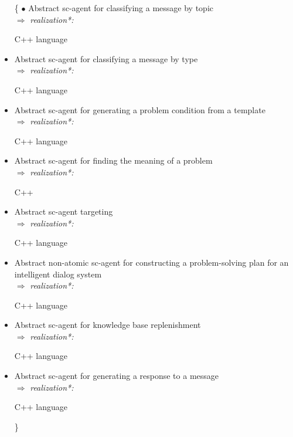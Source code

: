 \documentclass[a4paper, 10pt,]{article}
\begin{document}
\begin{itemize}
\item [\{ $\bullet$] Abstract sc-agent for classifying a message by topic
\\${\Rightarrow}$ 
\textit{realization*:}

\hspace{0.5cm}C++ language 

\item Abstract sc-agent for classifying a message by type
\\${\Rightarrow}$ 
\textit{realization*:}

\hspace{0.5cm}C++ language 
\item Abstract sc-agent for generating a problem condition from a template
\\${\Rightarrow}$ 
\textit{realization*:}

\hspace{0.5cm}C++ language 
\item Abstract sc-agent for finding the meaning of a problem
\\${\Rightarrow}$
\textit{realization*:}

\hspace{0.5cm}C++ 
\item Abstract sc-agent targeting
\\${\Rightarrow}$
\textit{realization*:}

\hspace{0.5cm}C++ language 
\item Abstract non-atomic sc-agent for constructing a problem-solving plan for an intelligent dialog system
\\${\Rightarrow}$
\textit{realization*:}

\hspace{0.5cm}C++ language 
\item Abstract sc-agent for knowledge base replenishment
\\${\Rightarrow}$
\textit{realization*:}

\hspace{0.5cm}C++ language 
\item Abstract sc-agent for generating a response to a message 
\\${\Rightarrow}$
\textit{realization*:}

\hspace{0.5cm}C++ language
\item [\}] 
\end{itemize}
\end{document}
